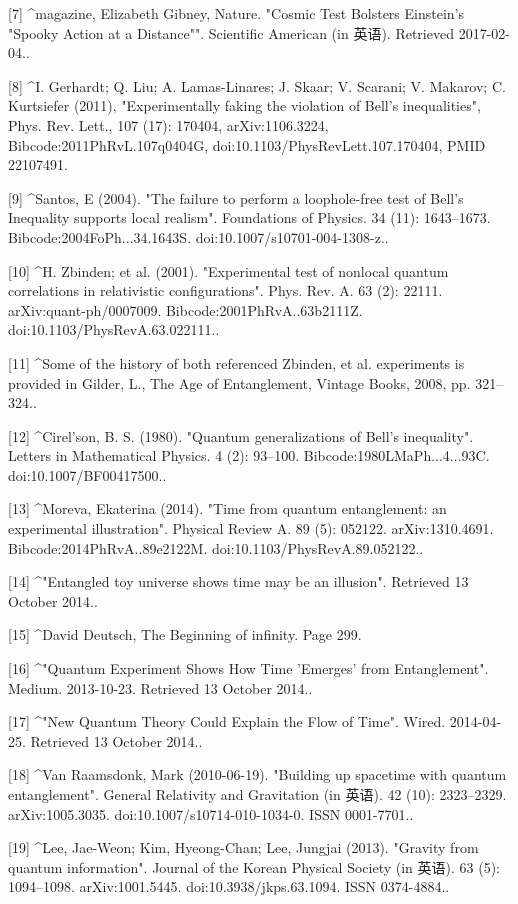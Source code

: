[7]
^magazine, Elizabeth Gibney, Nature. "Cosmic Test Bolsters Einstein's "Spooky Action at a Distance"". Scientific American (in 英语). Retrieved 2017-02-04..

[8]
^I. Gerhardt; Q. Liu; A. Lamas-Linares; J. Skaar; V. Scarani; V. Makarov; C. Kurtsiefer (2011), "Experimentally faking the violation of Bell's inequalities", Phys. Rev. Lett., 107 (17): 170404, arXiv:1106.3224, Bibcode:2011PhRvL.107q0404G, doi:10.1103/PhysRevLett.107.170404, PMID 22107491.

[9]
^Santos, E (2004). "The failure to perform a loophole-free test of Bell's Inequality supports local realism". Foundations of Physics. 34 (11): 1643–1673. Bibcode:2004FoPh...34.1643S. doi:10.1007/s10701-004-1308-z..

[10]
^H. Zbinden; et al. (2001). "Experimental test of nonlocal quantum correlations in relativistic configurations". Phys. Rev. A. 63 (2): 22111. arXiv:quant-ph/0007009. Bibcode:2001PhRvA..63b2111Z. doi:10.1103/PhysRevA.63.022111..

[11]
^Some of the history of both referenced Zbinden, et al. experiments is provided in Gilder, L., The Age of Entanglement, Vintage Books, 2008, pp. 321–324..

[12]
^Cirel'son, B. S. (1980). "Quantum generalizations of Bell's inequality". Letters in Mathematical Physics. 4 (2): 93–100. Bibcode:1980LMaPh...4...93C. doi:10.1007/BF00417500..

[13]
^Moreva, Ekaterina (2014). "Time from quantum entanglement: an experimental illustration". Physical Review A. 89 (5): 052122. arXiv:1310.4691. Bibcode:2014PhRvA..89e2122M. doi:10.1103/PhysRevA.89.052122..

[14]
^"Entangled toy universe shows time may be an illusion". Retrieved 13 October 2014..

[15]
^David Deutsch, The Beginning of infinity. Page 299.

[16]
^"Quantum Experiment Shows How Time 'Emerges' from Entanglement". Medium. 2013-10-23. Retrieved 13 October 2014..

[17]
^"New Quantum Theory Could Explain the Flow of Time". Wired. 2014-04-25. Retrieved 13 October 2014..

[18]
^Van Raamsdonk, Mark (2010-06-19). "Building up spacetime with quantum entanglement". General Relativity and Gravitation (in 英语). 42 (10): 2323–2329. arXiv:1005.3035. doi:10.1007/s10714-010-1034-0. ISSN 0001-7701..

[19]
^Lee, Jae-Weon; Kim, Hyeong-Chan; Lee, Jungjai (2013). "Gravity from quantum information". Journal of the Korean Physical Society (in 英语). 63 (5): 1094–1098. arXiv:1001.5445. doi:10.3938/jkps.63.1094. ISSN 0374-4884..

